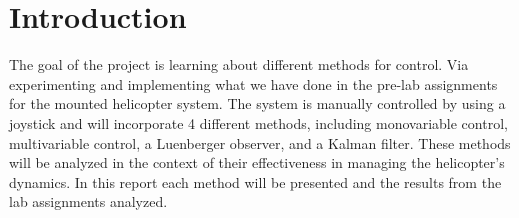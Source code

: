 \section{Introduction}
\vspace{1em}
The goal of the project is learning about different methods for control. Via experimenting and implementing what we have done in the pre-lab assignments for the mounted helicopter system. The system is manually controlled by using a joystick and will incorporate 4 different methods, including monovariable control, multivariable control, a Luenberger observer, and a Kalman filter. These methods will be analyzed in the context of their effectiveness in managing the helicopter's dynamics. In this report each method will be presented and the results from the lab assignments analyzed. 


